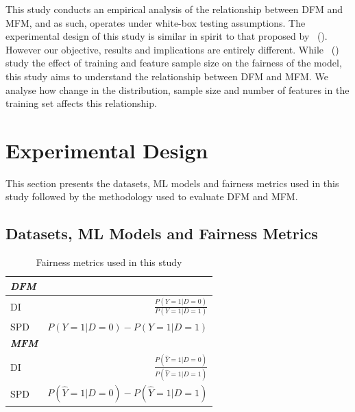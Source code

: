 \documentclass{article}
\newcommand{\citet}[1]{\citeauthor{#1}~(\citeyear{#1})}
\begin{document}

This study conducts an empirical analysis of the relationship between
DFM and MFM, and as such, operates under white-box testing
assumptions. The experimental design of this study is similar in
spirit to that proposed by \citet{zhang2021ignorance}. However our
objective, results and implications are entirely different. While
\citet{zhang2021ignorance} study the effect of training and feature
sample size on the fairness of the model, this study aims to
understand the relationship between DFM and MFM. We analyse how change
in the distribution, sample size and number of features in the
training set affects this relationship.

\section{Experimental Design}\label{sec:method}

This section presents the datasets, ML models and fairness metrics
used in this study followed by the methodology used to evaluate DFM
and MFM.

\subsection{Datasets, ML Models and Fairness Metrics}\label{sec:method-parameters}

\begin{table}
  \centering
  \begin{tabular}{l r}
    \toprule
    \textbf{\emph{DFM}}\\
    \midrule
    DI & \(\displaystyle \frac{P(Y=1|D=0)}{P(Y=1|D=1)}\)\\
    SPD & \(\displaystyle P(Y=1|D=0)-P(Y=1|D=1)\)\\
    \midrule
    \textbf{\emph{MFM}}\\
    \midrule
    DI & \(\displaystyle \frac{P(\hat{Y}=1|D=0)}{P(\hat{Y}=1|D=1)}\)\\
    SPD & \(\displaystyle P(\hat{Y}=1|D=0)-P(\hat{Y}=1|D=1)\)\\
    \bottomrule
  \end{tabular}
  \caption{Fairness metrics used in this study}
  \label{tab:fairness-metrics}
\end{table}
\end{document}
